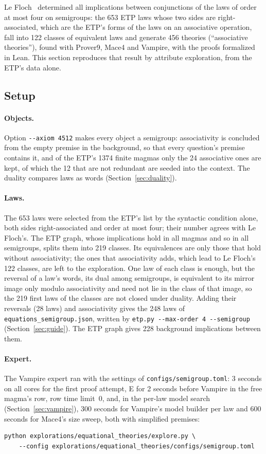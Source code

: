 \documentclass[11pt,a4paper]{article}
\theoremstyle{definition}
\theoremstyle{remark}
\newcommand{\code}[1]{\texttt{#1}}
\begin{document}
Le Floch~\cite{LF26b} determined all implications between conjunctions of the laws of order at most four on semigroups: the 653 ETP laws whose two sides are right-associated, which are the ETP's forms of the laws on an associative operation, fall into 122 classes of equivalent laws and generate 456 theories (``associative theories''), found with Prover9, Mace4 and Vampire, with the proofs formalized in Lean. This section reproduces that result by attribute exploration, from the ETP's data alone.

\subsection{Setup}

\paragraph{Objects.} Option \code{-{}-axiom 4512} makes every object a semigroup: associativity is concluded from the empty premise in the background, so that every question's premise contains it, and of the ETP's 1374 finite magmas only the 24 associative ones are kept, of which the 12 that are not redundant are seeded into the context. The duality compares laws as words (Section~\ref{sec:duality}).

\paragraph{Laws.} The 653 laws were selected from the ETP's list by the syntactic condition alone, both sides right-associated and order at most four; their number agrees with Le Floch's. The ETP graph, whose implications hold in all magmas and so in all semigroups, splits them into 219 classes. Its equivalences are only those that hold without associativity; the ones that associativity adds, which lead to Le Floch's 122 classes, are left to the exploration. One law of each class is enough, but the reversal of a law's words, its dual among semigroups, is equivalent to its mirror image only modulo associativity and need not lie in the class of that image, so the 219 first laws of the classes are not closed under duality. Adding their reversals (28 laws) and associativity gives the 248 laws of \code{equations\_semigroup.json}, written by \code{etp.py -{}-max-order 4 -{}-semigroup} (Section~\ref{sec:guide}). The ETP graph gives 228 background implications between them.

\paragraph{Expert.} The Vampire expert ran with the settings of \code{configs/semigroup.toml}: 3 seconds on all cores for the first proof attempt, E for 2 seconds before Vampire in the free magma's row, row time limit~$0$, and, in the per-law model search (Section~\ref{sec:vampire}), 300 seconds for Vampire's model builder per law and 600 seconds for Mace4's size sweep, both with simplified premises:
\begin{Verbatim}
python explorations/equational_theories/explore.py \
    --config explorations/equational_theories/configs/semigroup.toml
\end{Verbatim}
\end{document}

